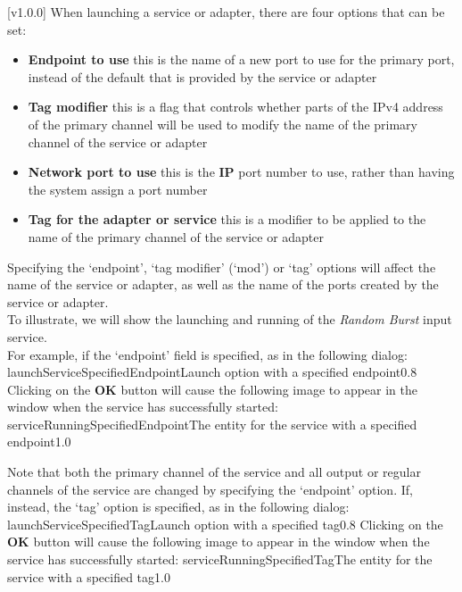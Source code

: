 [v1.0.0]
\appendixStart[TagsAndEndpoints]{\textitcorr{\WTE}}
When launching a service or adapter, there are four options that can be set:
\begin{itemize}
\item\textbf{Endpoint to use} this is the name of a new \yarp{} port to use for the
primary port, instead of the default that is provided by the service or adapter
\item\textbf{Tag modifier} this is a flag that controls whether parts of the IPv4 address
of the primary channel will be used to modify the name of the primary channel of the
service or adapter
\item\exSp\textbf{Network port to use} this is the \textbf{IP} port number to use, rather
than having the system assign a port number
\item\exSp\textbf{Tag for the adapter or service} this is a modifier to be applied to the
name of the primary channel of the service or adapter
\end{itemize}

Specifying the `endpoint', `tag modifier' (`mod') or `tag' options will affect the name of
the service or adapter, as well as the name of the \yarp{} ports created by the service or
adapter.\\

To illustrate, we will show the launching and running of the \emph{Random Burst} input
service.\\

For example, if the `endpoint' field is specified, as in the following dialog:
%
{launchServiceSpecifiedEndpoint}{Launch option with a specified endpoint}{0.8}
\condPage{}
Clicking on the \textbf{OK} button will cause the following image to appear in the
\emph{\MMMU} window when the service has successfully started:
%
{serviceRunningSpecifiedEndpoint}{The \emph{\MMMU} entity for the service with a specified
endpoint}{1.0}

Note that both the primary channel of the service and all output or regular channels of
the service are changed by specifying the `endpoint' option.
If, instead, the `tag' option is specified, as in the following dialog:
%
{launchServiceSpecifiedTag}{Launch option with a specified tag}{0.8}
\condPage{}
Clicking on the \textbf{OK} button will cause the following image to appear in the
\emph{\MMMU} window when the service has successfully started:
%
{serviceRunningSpecifiedTag}{The \emph{\MMMU} entity for the service with a specified
tag}{1.0}

